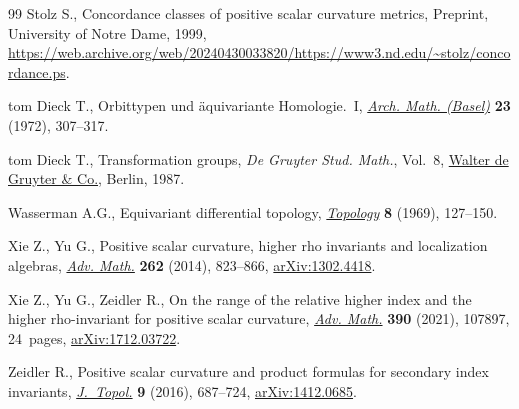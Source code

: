 \documentclass[pdftex]{sigma}
\numberwithin{equation}{section}
\begin{document}
\begin{thebibliography}{99}
Stolz S., Concordance classes of positive scalar curvature metrics, {P}reprint, University of Notre Dame, 1999, \url{https://web.archive.org/web/20240430033820/https://www3.nd.edu/~stolz/concordance.ps}.

tom Dieck T., Orbittypen und \"aquivariante {H}omologie.~{I},
 \href{https://doi.org/10.1007/BF01304886}{\textit{Arch. Math. (Basel)}}
 \textbf{23} (1972), 307--317.

tom Dieck T., Transformation groups, \textit{De Gruyter Stud. Math.}, Vol.~8,
 \href{https://doi.org/10.1515/9783110858372.312}{Walter de Gruyter \& Co.},
 Berlin, 1987.

Wasserman A.G., Equivariant differential topology,
 \href{https://doi.org/10.1016/0040-9383(69)90005-6}{\textit{Topology}}
 \textbf{8} (1969), 127--150.

Xie Z., Yu G., Positive scalar curvature, higher rho invariants and
 localization algebras,
 \href{https://doi.org/10.1016/j.aim.2014.06.001}{\textit{Adv. Math.}}
 \textbf{262} (2014), 823--866,
 \href{http://arxiv.org/abs/1302.4418}{arXiv:1302.4418}.

Xie Z., Yu G., Zeidler R., On the range of the relative higher index and the
 higher rho-invariant for positive scalar curvature,
 \href{https://doi.org/10.1016/j.aim.2021.107897}{\textit{Adv. Math.}}
 \textbf{390} (2021), 107897, 24~pages,
 \href{http://arxiv.org/abs/1712.03722}{arXiv:1712.03722}.

Zeidler R., Positive scalar curvature and product formulas for secondary index
 invariants, \href{https://doi.org/10.1112/jtopol/jtw005}{\textit{J.~Topol.}}
 \textbf{9} (2016), 687--724,
 \href{http://arxiv.org/abs/1412.0685}{arXiv:1412.0685}.

\end{thebibliography}\LastPageEnding
\end{document}
